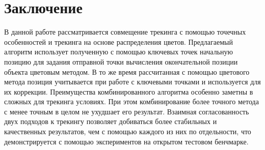 \section{Заключение}


В данной работе рассматривается совмещение трекинга с помощью точечных
особенностей и трекинга на основе распределения цветов.
Предлагаемый алгоритм использует полученную с помощью ключевых точек начальную
позицию для задания отправной точки вычисления окончательной позиции объекта
цветовым методом.
В то же время рассчитанная с помощью цветового метода позиция учитывается при
работе с ключевыми точками и используется для их коррекции.
Преимущества комбинированного алгоритма особенно заметны в сложных для трекинга
условиях.
При этом комбинирование более точного метода с менее точным в целом не ухудшает
его результат.
Взаимная согласованность двух подходов к трекингу позволяет добиваться более
стабильных и качественных результатов, чем с помощью каждого из них по
отдельности, что демонстрируется с помощью экспериментов на открытом тестовом
бенчмарке.
